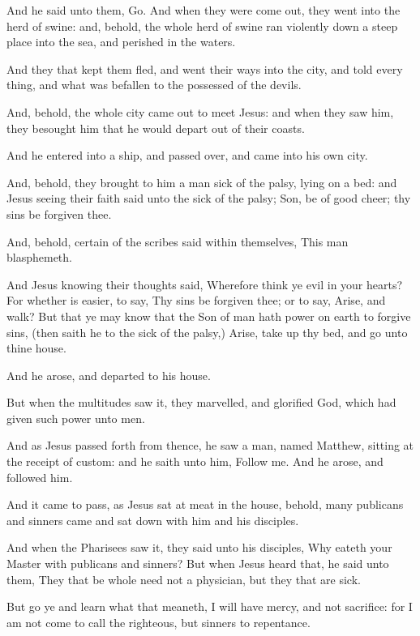 \Verse And he said unto them, Go. And when they were come out, they went into the herd of swine: and, behold, the whole herd of swine ran violently down a steep place into the sea, and perished in the waters.

\Verse And they that kept them fled, and went their ways into the city, and told every thing, and what was befallen to the possessed of the devils.

\Verse And, behold, the whole city came out to meet Jesus: and when they saw him, they besought him that he would depart out of their coasts.


\Chapter
\Verse And he entered into a ship, and passed over, and came into his own city.

\Verse And, behold, they brought to him a man sick of the palsy, lying on a bed: and Jesus seeing their faith said unto the sick of the palsy; Son, be of good cheer; thy sins be forgiven thee.

\Verse And, behold, certain of the scribes said within themselves, This man blasphemeth.

\Verse And Jesus knowing their thoughts said, Wherefore think ye evil in your hearts?  \Verse For whether is easier, to say, Thy sins be forgiven thee; or to say, Arise, and walk?  \Verse But that ye may know that the Son of man hath power on earth to forgive sins, (then saith he to the sick of the palsy,) Arise, take up thy bed, and go unto thine house.

\Verse And he arose, and departed to his house.

\Verse But when the multitudes saw it, they marvelled, and glorified God, which had given such power unto men.

\Verse And as Jesus passed forth from thence, he saw a man, named Matthew, sitting at the receipt of custom: and he saith unto him, Follow me. And he arose, and followed him.

\Verse And it came to pass, as Jesus sat at meat in the house, behold, many publicans and sinners came and sat down with him and his disciples.

\Verse And when the Pharisees saw it, they said unto his disciples, Why eateth your Master with publicans and sinners?  \Verse But when Jesus heard that, he said unto them, They that be whole need not a physician, but they that are sick.

\Verse But go ye and learn what that meaneth, I will have mercy, and not sacrifice: for I am not come to call the righteous, but sinners to repentance.

